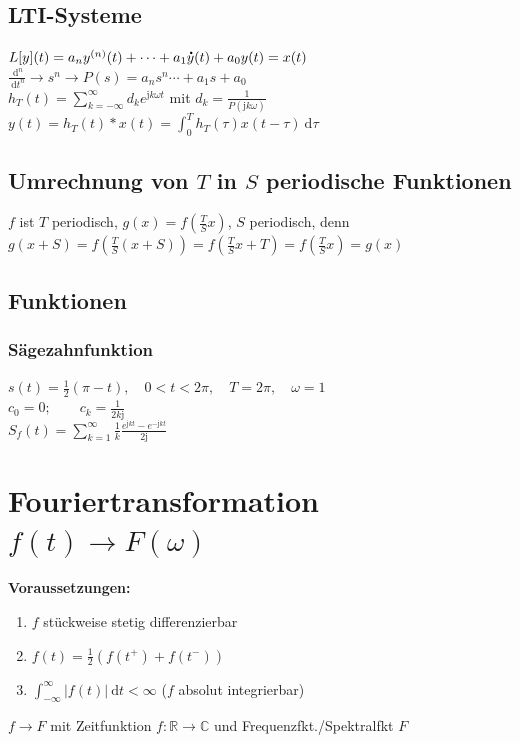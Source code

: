 \documentclass[6pt,a4paper]{scrartcl}
\newcommand{\abs}[1]{\ensuremath{\left\vert#1\right\vert}} 						%
\renewcommand{\emph}[1]{\textbf{#1}}
\renewcommand*{\dot}[1]{\accentset{\mbox{\textrm{\large\bfseries .}} }{#1}}
\renewcommand{\i}{\ensuremath{\mathrm{j}}}										%
\newcommand{\ra}[0]{\ensuremath{\rightarrow}} 									%
\newcommand{\diff}{\ensuremath{\ \mathrm d}}									%
\newcommand{\R}{\ensuremath{\mathbb R}}
\newcommand{\C}{\ensuremath{\mathbb C}}
\begin{document}
\begin{multicols}{4}
	\subsection{LTI-Systeme}
	$L[y](t) = a_n y^{(n)}(t) + \cdots + a_1 \dot{y}(t) + a_0 y(t) = x(t)$\\
	$\frac{\diff^n}{\diff t^n} \ra s^n \ra P(s) = a_n s^n \cdots + a_1 s + a_0$\\
	$h_T(t) = \sum_{k=-\infty}^{\infty}d_k e^{\i k \omega t}$ mit $d_k = \frac{1}{P(\i k \omega)}$\\
	$y(t) = h_T(t)*x(t) = \int_0^T h_T(\tau) x(t - \tau) \diff \tau$

	\subsection{Umrechnung von $T$ in $S$ periodische Funktionen}
	$f$ ist $T$ periodisch, $g(x) = f\left( \frac{T}{S} x \right)$, $S$ periodisch, denn
	$g(x+S) = f\left( \frac{T}{S} (x+S) \right) = f\left( \frac{T}{S} x + T \right) = f\left( \frac{T}{S} x \right) = g(x)$\\
	
	\subsection{Funktionen}
	\subsubsection{Sägezahnfunktion}
	$s(t) = \frac{1}{2}(\pi - t), \quad 0 < t < 2 \pi, \quad T = 2 \pi, \quad \omega = 1$\\
	$c_0 = 0; \qquad c_k = \frac{1}{2k \i}$\\
	$S_f(t) = \sum_{k=1}^{\infty}\frac{1}{k}\frac{e^{\i k t} - e^{-\i k t}}{2 \i}$

	\section{Fouriertransformation $f(t) \ra F(\omega)$}
	\emph{Voraussetzungen:}
	\begin{enumerate}
		\item $f$ stückweise stetig differenzierbar
		\item $f(t) = \frac{1}{2}\left(f(t^+) + f(t^-)\right)$
		\item $\int_{-\infty}^{\infty}\abs{f(t)} \diff t < \infty$ ($f$ absolut integrierbar)
	\end{enumerate}
	$f \ra F$ mit Zeitfunktion $f:\R \ra \C$ und Frequenzfkt./Spektralfkt $F$\\
	\boxed{ F(\omega) := \int\limits_{-\infty}^\infty f(t) \exp(-\i \omega t) \diff t} \\
	

\end{multicols}
\end{document}

